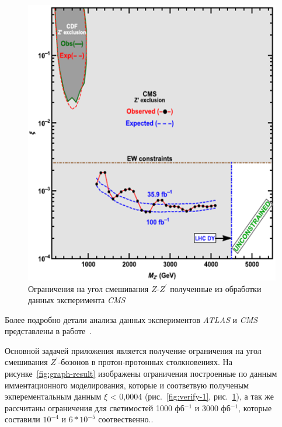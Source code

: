 \begin{figure}[!h]
	\centering
	\includegraphics[width=\textwidth]{figures/verify-2.png}
	\caption{Ограничения на угол смешивания $Z$-${Z}^{\prime}$ полученные из обработки данных эксперимента \textit{CMS}}
	\label{fig:verify-2}
\end{figure}

Более подробно детали анализа данных экспериментов \textit{ATLAS} и \textit{CMS} представлены в работе~\cite{2part-pankov}. 

Основной задачей приложения является получение ограничения на угол смешивания ${Z}^{\prime}$-бозонов в протон-протонных столкновениях. На рисунке~\ref{fig:graph-result} изображены ограничения построенные по данным имментационного моделирования, которые и соответвую полученым экперементальным данным $\xi$ < 0,0004 (рис.~\ref{fig:verify-1}, рис.~\ref{fig:verify-2}), а так же рассчитаны ограничения для светимостей 1000 фб${}^{−1}$ и 3000 фб${}^{−1}$, которые составили ${10}^{-4}$ и $6*{10}^{-5}$ соотвественно..


